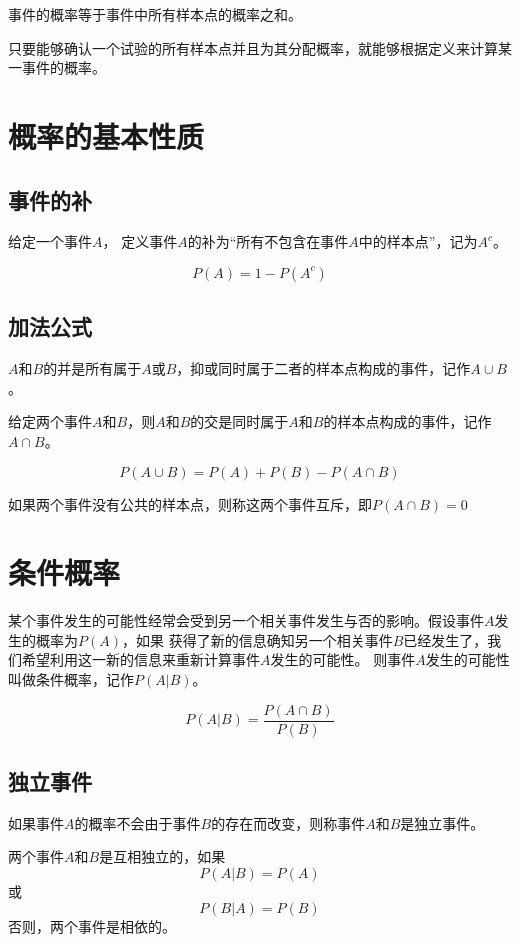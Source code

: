 \documentclass[a4paper]{ctexrep}
\begin{document}
\begin{tcolorbox}[title = {事件的概率}]
事件的概率等于事件中所有样本点的概率之和。
\end{tcolorbox}

只要能够确认一个试验的所有样本点并且为其分配概率，就能够根据定义来计算某一事件的概率。

\section{概率的基本性质}
\subsection{事件的补}
给定一个事件$A$， 定义事件$A$的补为“所有不包含在事件$A$中的样本点”，记为$A^{c}$。
\begin{tcolorbox}[title = {利用事件的补计算概率}]
\[P(A)=1-P(A^{c})\]
\end{tcolorbox}

\subsection{加法公式}
\begin{tcolorbox}[title = {两个事件的并}]
$A$和$B$的并是所有属于$A$或$B$，抑或同时属于二者的样本点构成的事件，记作$A\cup B$。
\end{tcolorbox}

\begin{tcolorbox}[title = {两个事件的交}]
给定两个事件$A$和$B$，则$A$和$B$的交是同时属于$A$和$B$的样本点构成的事件，记作$A\cap B$。
\end{tcolorbox}

\begin{tcolorbox}[title = {加法公式}]
\[P(A\cup B)=P(A)+P(B)-P(A\cap B)\]
\end{tcolorbox}

\begin{tcolorbox}[title = {互斥事件}]
如果两个事件没有公共的样本点，则称这两个事件互斥，即$P(A\cap B) = 0$
\end{tcolorbox}

\section{条件概率}
某个事件发生的可能性经常会受到另一个相关事件发生与否的影响。假设事件$A$发生的概率为$P(A)$，如果
获得了新的信息确知另一个相关事件$B$已经发生了，我们希望利用这一新的信息来重新计算事件$A$发生的可能性。
则事件$A$发生的可能性叫做条件概率，记作$P(A|B)$。
\begin{tcolorbox}[title = {条件概率}]
\[P(A|B)=\frac{P(A\cap B)}{P(B)}\]
\end{tcolorbox}

\subsection{独立事件}
如果事件$A$的概率不会由于事件$B$的存在而改变，则称事件$A$和$B$是独立事件。
\begin{tcolorbox}[title = {独立事件}]
两个事件$A$和$B$是互相独立的，如果
\[P(A|B) = P(A)\]
或
\[P(B|A)=P(B)\]
否则，两个事件是相依的。
\end{tcolorbox}
\end{document}
